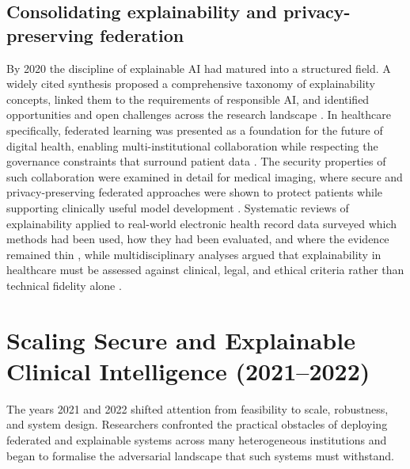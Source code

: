 \documentclass[11pt,a4paper]{article}
\begin{document}
\subsection{Consolidating explainability and privacy-preserving federation}
By 2020 the discipline of explainable AI had matured into a structured field. A
widely cited synthesis proposed a comprehensive taxonomy of explainability
concepts, linked them to the requirements of responsible AI, and identified
opportunities and open challenges across the research landscape \cite{ref20}. In
healthcare specifically, federated learning was presented as a foundation for
the future of digital health, enabling multi-institutional collaboration while
respecting the governance constraints that surround patient data \cite{ref21}.
The security properties of such collaboration were examined in detail for
medical imaging, where secure and privacy-preserving federated approaches were
shown to protect patients while supporting clinically useful model development
\cite{ref22}. Systematic reviews of explainability applied to real-world
electronic health record data surveyed which methods had been used, how they had
been evaluated, and where the evidence remained thin \cite{ref23}, while
multidisciplinary analyses argued that explainability in healthcare must be
assessed against clinical, legal, and ethical criteria rather than technical
fidelity alone \cite{ref24}.

\section{Scaling Secure and Explainable Clinical Intelligence (2021--2022)}
The years 2021 and 2022 shifted attention from feasibility to scale, robustness,
and system design. Researchers confronted the practical obstacles of deploying
federated and explainable systems across many heterogeneous institutions and
began to formalise the adversarial landscape that such systems must withstand.
\end{document}
